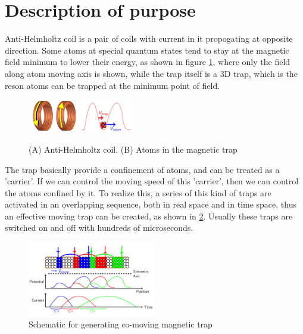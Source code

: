 \documentclass[11pt, xcolor=dvipsnames]{article}
\begin{document}
\section{Description of purpose}
Anti-Helmholtz coil is a pair of coils with current in it propogating at opposite direction. Some atoms at special quantum states tend to stay at the magnetic field minimum to lower their energy, as shown in figure \ref{fig1}, where only the field along atom moving axis is shown, while the trap itself is a 3D trap, which is the reson atoms can be trapped at the minimum point of field.\\ \begin{figure}[h]\centering  \includegraphics[width = 0.2\textwidth, height= 0.15\textwidth]{antiHelmholtz} \includegraphics[width = 0.2\textwidth, height= 0.15\textwidth]{trap} \caption{(A) Anti-Helmholtz coil. (B) Atoms in the magnetic trap} \label{fig1} \end{figure} The trap basically provide a confinement of atoms, and can be treated as a 'carrier'. If we can control the moving speed of this 'carrier', then we can control the atoms confined by it. To realize this, a series of this kind of traps are activated in an overlapping sequence, both in real space and in time space, thus an effective moving trap can be created, as shown in \ref{fig2}. Usually these traps are switched on and off with hundreds of microseconds.\\\begin{figure}[h!]\centering \includegraphics[width = 0.5\textwidth, height=0.3\textwidth]{switching} \caption{Schematic for generating co-moving magnetic trap} \label{fig2}\end{figure}
\end{document}
